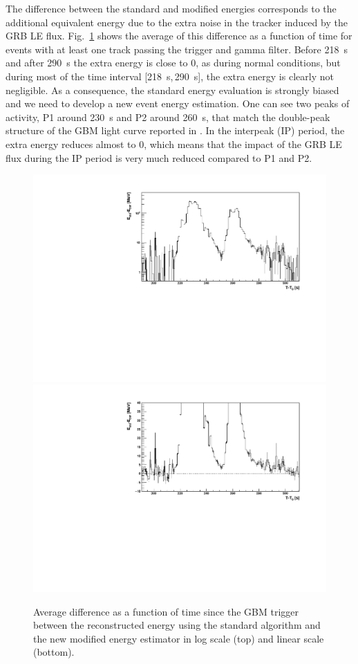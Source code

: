 \documentclass[preprint]{aastex631}
\begin{document}
The difference between the standard and modified energies corresponds to the additional equivalent energy due to the extra noise in the tracker induced by the GRB LE flux. Fig.~\ref{fig:diff_energy_corr} shows the average of this difference as a function of time for events with at least one track passing the trigger and gamma filter. Before 218~s and after 290~s the extra energy is close to 0, as during normal conditions, but during most of the time interval [218~s,\,290~s], the extra energy is clearly not negligible. As a consequence, the standard energy evaluation is strongly biased and we need to develop a new event energy estimation. One can see two peaks of activity, P1 around 230~s and P2 around 260~s, that match the double-peak structure of the GBM light curve reported in \cite{2023ApJ...952L..42L}. In the interpeak (IP) period, the extra energy reduces almost to 0, which means that the impact of the GRB LE flux during the IP period is very much reduced compared to P1 and P2.

\begin{figure}[t]
    \centering    
    \includegraphics[width=0.7\linewidth]{paper_newshowEnergyTkr_sc1l.pdf}
    \includegraphics[width=0.7\linewidth]{paper_newshowEnergyTkr_sc1.pdf}
    \caption{Average difference as a function of time since the GBM trigger between the reconstructed energy using the standard algorithm and the new modified energy estimator in log scale (top) and linear scale (bottom). }
    \label{fig:diff_energy_corr}
\end{figure}
\end{document}

